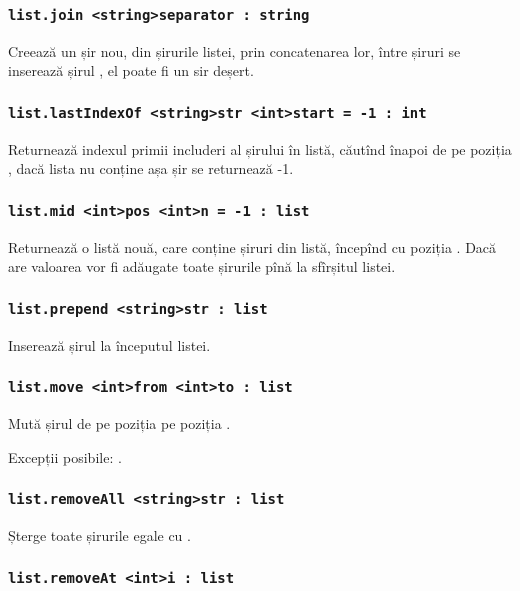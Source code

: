 \subsubsection{\lstinline|list.join <string>separator : string|}

Creează un șir nou, din șirurile listei, prin concatenarea lor, între șiruri se inserează șirul , el poate fi un sir deșert.

\subsubsection{\lstinline|list.lastIndexOf <string>str <int>start = -1 : int|}

Returnează indexul primii includeri al șirului  în listă, căutînd înapoi de pe poziția , dacă lista nu conține așa șir se returnează -1.

\subsubsection{\lstinline|list.mid <int>pos <int>n = -1 : list|}

Returnează o listă nouă, care conține  șiruri din listă, începînd cu poziția . Dacă  are valoarea  vor fi adăugate toate șirurile pînă la sfîrșitul listei.

\subsubsection{\lstinline|list.prepend <string>str : list|}

Inserează șirul  la începutul listei.

\subsubsection{\lstinline|list.move <int>from <int>to : list|}

Mută șirul de pe poziția  pe poziția .

Excepții posibile: .

\subsubsection{\lstinline|list.removeAll <string>str : list|}

Șterge toate șirurile egale cu .

\subsubsection{\lstinline|list.removeAt <int>i : list|}

